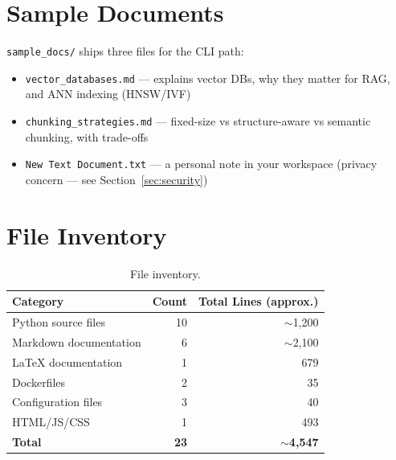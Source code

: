 \documentclass[11pt,a4paper]{paper}
\begin{document}
\section{Sample Documents}

\texttt{sample\_docs/} ships three files for the CLI path:
\begin{itemize}
  \item \texttt{vector\_databases.md} — explains vector DBs, why they matter for RAG, and ANN indexing (HNSW/IVF)
  \item \texttt{chunking\_strategies.md} — fixed-size vs structure-aware vs semantic chunking, with trade-offs
  \item \texttt{New Text Document.txt} — a personal note in your workspace (privacy concern — see Section~\ref{sec:security})
\end{itemize}

\section{File Inventory}

\begin{table}[h]
\centering
\small
\begin{tabular}{l rr}
\toprule
\textbf{Category} & \textbf{Count} & \textbf{Total Lines (approx.)} \\
\midrule
Python source files & 10 & $\sim$1,200 \\
Markdown documentation & 6 & $\sim$2,100 \\
LaTeX documentation & 1 & 679 \\
Dockerfiles & 2 & 35 \\
Configuration files & 3 & 40 \\
HTML/JS/CSS & 1 & 493 \\
\bottomrule
\textbf{Total} & \textbf{23} & \textbf{$\sim$4,547} \\
\bottomrule
\end{tabular}
\caption{File inventory.}
\label{tab:file-inventory}
\end{table}
\end{document}
